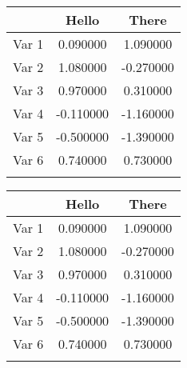 \documentclass{article}%
\begin{document}
\begin{table}[htbp]%
\renewcommand\cellalign{t}
\begin{threeparttable}
\begin{tabular}{lcc}
\toprule
 & Hello & There \\
\midrule
\addlinespace
Var 1 & 0.090000 & 1.090000 \\
Var 2 & 1.080000 & -0.270000 \\
Var 3 & 0.970000 & 0.310000 \\
Var 4 & -0.110000 & -1.160000 \\
Var 5 & -0.500000 & -1.390000 \\
Var 6 & 0.740000 & 0.730000 \\
\addlinespace
\bottomrule
\end{tabular}
\footnotesize 
\end{threeparttable}%
\end{table}

%


\begin{table}[htbp]%
\renewcommand\cellalign{t}
\begin{threeparttable}
\begin{tabular}{lcc}
\toprule
 & Hello & There \\
\midrule
\addlinespace
Var 1 & 0.090000 & 1.090000 \\
Var 2 & 1.080000 & -0.270000 \\
Var 3 & 0.970000 & 0.310000 \\
Var 4 & -0.110000 & -1.160000 \\
Var 5 & -0.500000 & -1.390000 \\
Var 6 & 0.740000 & 0.730000 \\
\addlinespace
\bottomrule
\end{tabular}
\footnotesize 
\end{threeparttable}%
\end{table}

%
\end{document}

